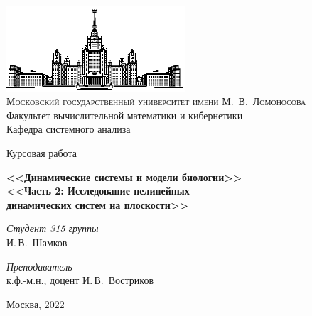 \documentclass[11pt]{article}
\begin{document}
\thispagestyle{empty}

\begin{center}
\ \vspace{-3cm}

\includegraphics[width=0.5\textwidth]{msu.eps}\\
{\scshape Московский государственный университет имени М.~В.~Ломоносова}\\
Факультет вычислительной математики и кибернетики\\
Кафедра системного анализа

\vfill

{\LARGE Курсовая работа}

\vspace{1cm}

{\LARGE\bfseries <<Динамические системы и модели биологии>>} \\
\vspace{1cm}
{\Large\bfseries <<Часть 2: Исследование нелинейных  \\
динамических систем на плоскости>>}
\end{center}

\vspace{1cm}

\begin{flushright}
  \large
  \textit{Студент 315 группы}\\
  И.\,В.~Шамков

  \vspace{5mm}

  \textit{Преподаватель}\\
  к.ф.-м.н., доцент И.\,В.~Востриков
\end{flushright}

\vfill

\begin{center}
Москва, 2022
\end{center}

\newpage
\tableofcontents
\newpage
\end{document}
